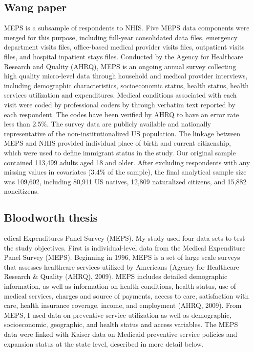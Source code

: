 \documentclass[../main.tex]{subfiles}
\begin{document}
\subsection{Wang paper}
MEPS is a subsample of respondents to NHIS. Five MEPS data components were merged for this purpose, including full-year consolidated data files, emergency department visits files, office-based medical provider visits files, outpatient visits files, and hospital inpatient stays files. Conducted by the Agency for Healthcare Research and Quality (AHRQ), MEPS is an ongoing annual survey collecting high quality micro-level data through household and medical provider interviews, including demographic characteristics, socioeconomic status, health status, health services utilization and expenditures. Medical conditions associated with each visit were coded by professional coders by through verbatim text reported by each respondent. The codes have been verified by AHRQ to have an error rate less than 2.5\%. The survey data are publicly available and nationally representative of the non-institutionalized US population. The linkage between MEPS and NHIS provided individual place of birth and current citizenship, which were used to define immigrant status in the study. Our original sample contained 113,499 adults aged 18 and older. After excluding respondents with any missing values in covariates (3.4\% of the sample), the final analytical sample size was 109,602, including 80,911 US natives, 12,809 naturalized citizens, and 15,882 noncitizens.

\subsection{Bloodworth thesis}

edical Expenditures Panel Survey (MEPS). My study used four data sets to test the study objectives. First is individual-level data from the Medical Expenditure Panel Survey (MEPS). Beginning in 1996, MEPS is a set of large scale surveys that assesses healthcare services utilized by Americans (Agency for Healthcare Research \& Quality (AHRQ), 2009). MEPS includes detailed demographic information, as well as information on health conditions, health status, use of medical services, charges and source of payments, access to care, satisfaction with care, health insurance coverage, income, and employment (AHRQ, 2009). From MEPS, I used data on preventive service utilization as well as demographic, socioeconomic, geographic, and health status and access variables. The MEPS data were linked with Kaiser data on Medicaid preventive service policies and expansion status at the state level, described in more detail below.
\end{document}

